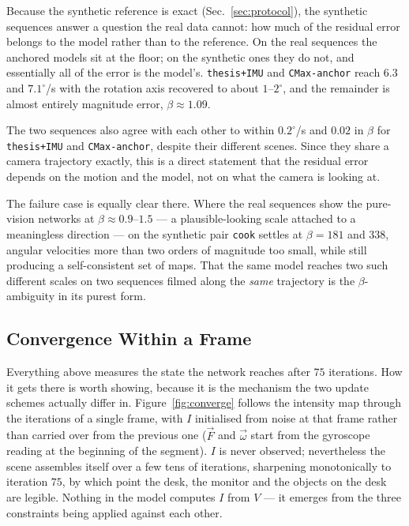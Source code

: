\documentclass[journal]{IEEEtran}
\newcommand{\Imap}{I}
\newcommand{\Vmap}{V}
\newcommand{\Fmap}{\vec{F}}
\newcommand{\wvec}{\vec{\omega}}
\begin{document}
Because the synthetic reference is exact (Sec.~\ref{sec:protocol}), the
synthetic sequences answer a question the real data cannot: how much of the
residual error belongs to the model rather than to the reference. On the real
sequences the anchored models sit at the floor; on the synthetic ones they do
not, and essentially all of the error is the model's. \texttt{thesis+IMU} and
\texttt{CMax-anchor} reach $6.3$ and $7.1^\circ$/s with the rotation axis
recovered to about $1$--$2^\circ$, and the remainder is almost entirely
magnitude error, $\beta \approx 1.09$.

The two sequences also agree with each other to within $0.2^\circ$/s and
$0.02$ in $\beta$ for \texttt{thesis+IMU} and \texttt{CMax-anchor}, despite
their different scenes. Since they share a camera trajectory exactly, this is a direct
statement that the residual error depends on the motion and the model, not on
what the camera is looking at.

The failure case is equally clear there. Where the real sequences show the
pure-vision networks at $\beta \approx 0.9$--$1.5$ --- a plausible-looking scale
attached to a meaningless direction --- on the synthetic pair \texttt{cook}
settles at $\beta = 181$ and $338$, angular velocities more than two orders of
magnitude too small, while still producing a self-consistent set of maps. That
the same model reaches two such different scales on two sequences filmed along
the \emph{same} trajectory is the $\beta$-ambiguity in its purest form.

\subsection{Convergence Within a Frame}
\label{sec:converge}

Everything above measures the state the network reaches after $75$ iterations.
How it gets there is worth showing, because it is the mechanism the two update
schemes actually differ in. Figure~\ref{fig:converge} follows the intensity map
through the iterations of a single frame, with $\Imap$ initialised from noise at
that frame rather than carried over from the previous one ($\Fmap$ and $\wvec$
start from the gyroscope reading at the beginning of the segment). $\Imap$ is
never observed; nevertheless the scene assembles itself over a few tens of
iterations, sharpening monotonically to iteration $75$, by which point the desk,
the monitor and the objects on the desk are legible. Nothing in the model
computes $\Imap$ from $\Vmap$ --- it emerges from the three constraints being
applied against each other.
\end{document}
